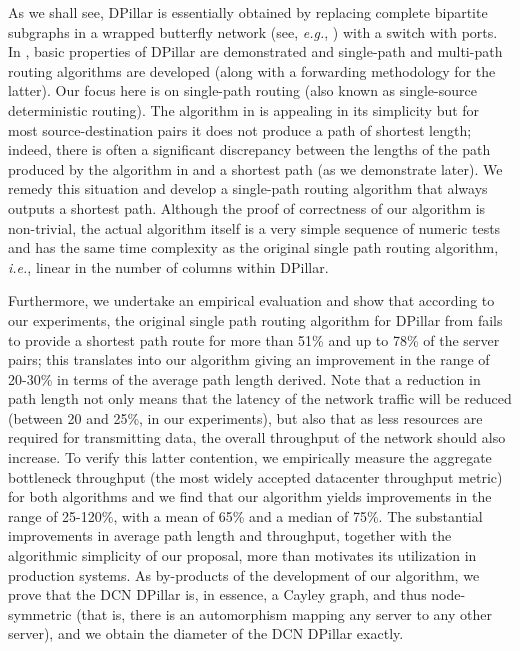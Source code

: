 \documentclass{article}
\begin{document}
As we shall see, DPillar is essentially obtained by replacing complete bipartite subgraphs  in a wrapped butterfly network (see, \emph{e.g.}, \cite{Lei92}) with a switch with  ports. In \cite{LYY12}, basic properties of DPillar are demonstrated and single-path and multi-path routing algorithms are developed (along with a forwarding methodology for the latter). Our focus here is on single-path routing (also known as single-source deterministic routing). The algorithm in \cite{LYY12} is appealing in its simplicity but for most source-destination pairs it does not produce a path of shortest length; indeed, there is often a significant discrepancy between the lengths of the path produced by the algorithm in \cite{LYY12} and a shortest path (as we demonstrate later). We remedy this situation and develop a single-path routing algorithm that always outputs a shortest path. Although the proof of correctness of our algorithm is non-trivial, the actual algorithm itself is a very simple sequence of numeric tests and has the same time complexity as the original single path routing algorithm, \emph{i.e.}, linear in the number of columns within DPillar. 


Furthermore, we undertake an empirical evaluation and show that according to our experiments, the original single path routing algorithm for DPillar from \cite{LYY12} fails to provide a shortest path route for more than 51\% and up to 78\% of the server pairs; this translates into our algorithm giving an improvement in the range of 20-30\% in terms of the average path length derived. Note that a reduction in path length not only means that the latency of the network traffic will be reduced (between 20 and 25\%, in our experiments), but also that as less resources are required for transmitting data, the overall throughput of the network should also increase. To verify this latter contention, we empirically measure the aggregate bottleneck throughput (the most widely accepted datacenter throughput metric) for both algorithms and we find that our algorithm yields improvements in the range of 25-120\%, with a mean of 65\% and a median of 75\%. The substantial improvements in average path length and throughput, together with the algorithmic simplicity of our proposal, more than motivates its utilization in production systems. As by-products of the development of our algorithm, we prove that the DCN DPillar is, in essence, a Cayley graph, and thus node-symmetric (that is, there is an automorphism mapping any server to any other server), and we obtain the diameter of the DCN DPillar exactly. 
\end{document}
